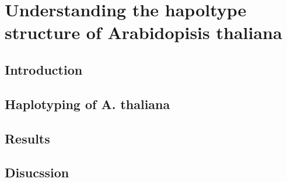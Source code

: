 
\chapter{Understanding the hapoltype structure of Arabidopisis thaliana } %

\label{Chapter1} %




\section{Introduction}

\section{Haplotyping of A. thaliana}

\section{Results}


\section{Disucssion}


